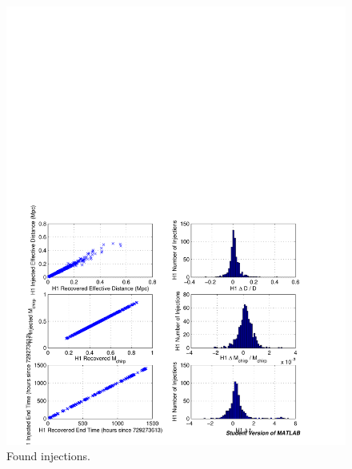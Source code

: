 \begin{figure}[p]
\begin{center}
\includegraphics[width=\textwidth]{analysis/figures/h1_param_error}
\end{center}
\caption{\label{f:h1_param_error}%
Found injections.
}
\end{figure}

